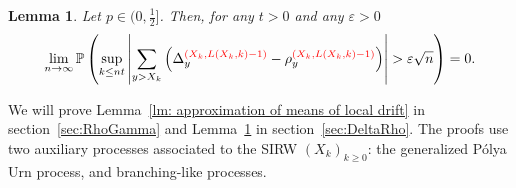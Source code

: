 \documentclass[twoside,12pt,a4paper]{article}
\newtheorem{lemma}{Lemma}[section]
\numberwithin{equation}{section}
\newcommand{\abs}[1]{\left\vert #1 \right\vert}
\newcommand{\edt}[1]{\textcolor{red}{#1}} %
\begin{document}
	\begin{lemma}\label{lm: approx local drift by conditional means}
		Let $p\in (0,\frac{1}{2}]$. Then, for any $t>0$ and any $\varepsilon >0$
		\begin{equation}\label{eq: control of martingale difference for local drift}
			\lim_{n \to \infty }\mathbb{P}\left(\sup_{k\leq nt} \abs{\sum_{y> X_k} \left(\Delta_{y}^{\edt{(X_k,L(X_k,k)-1)}}- \rho_{y}^{\edt{(X_k,L(X_k,k)-1)}} \right)   }  > \varepsilon \sqrt{n}  \right) =0. 
		\end{equation}
	\end{lemma}
	
	
	We will prove Lemma~\ref{lm: approximation of means of local drift} in section~\ref{sec:RhoGamma} and Lemma~\ref{lm: approx local drift by conditional means} in section~\ref{sec:DeltaRho}. The proofs use two auxiliary processes associated to the SIRW $(X_k)_{k\geq 0}$: the generalized P\'{o}lya Urn process, and branching-like processes. 
	
\end{document}
